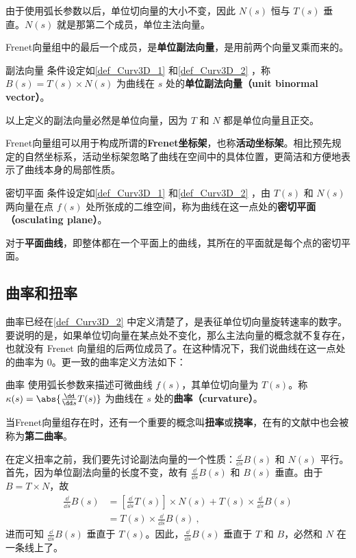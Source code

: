 由于使用弧长参数以后，单位切向量的大小不变，因此 $N(s)$ 恒与 $T(s)$ 垂直。$N(s)$ 就是那第二个成员，单位主法向量。

Frenet向量组中的最后一个成员，是\textbf{单位副法向量}，是用前两个向量叉乘而来的。

\begin{definition}{副法向量}
条件设定如\autoref{def_Curv3D_1} 和\autoref{def_Curv3D_2} ，称 $B(s)=T(s)\times N(s)$ 为曲线在 $s$ 处的\textbf{单位副法向量（unit binormal vector）}。
\end{definition}

以上定义的副法向量必然是单位向量，因为 $T$ 和 $N$ 都是单位向量且正交。

Frenet向量组可以用于构成所谓的\textbf{Frenet坐标架}，也称\textbf{活动坐标架}。相比预先规定的自然坐标系，活动坐标架忽略了曲线在空间中的具体位置，更简洁和方便地表示了曲线本身的局部性质。

\begin{definition}{密切平面}
条件设定如\autoref{def_Curv3D_1} 和\autoref{def_Curv3D_2} ，由 $T(s)$ 和 $N(s)$ 两向量在点 $f(s)$ 处所张成的二维空间，称为曲线在这一点处的\textbf{密切平面（osculating plane）}。
\end{definition}

对于\textbf{平面曲线}，即整体都在一个平面上的曲线，其所在的平面就是每个点的密切平面。

\subsection{曲率和扭率}

曲率已经在\autoref{def_Curv3D_2} 中定义清楚了，是表征单位切向量旋转速率的数字。要说明的是，如果单位切向量在某点处不变化，那么主法向量的概念就不复存在，也就没有 Frenet 向量组的后两位成员了。在这种情况下，我们说曲线在这一点处的曲率为 $0$。更一致的曲率定义方法如下：
\begin{definition}{曲率}
使用弧长参数来描述可微曲线 $f(s)$，其单位切向量为 $T(s)$。称 $\kappa(s)=\abs{\frac{\dd}{\dd s}T(s)}$ 为曲线在 $s$ 处的\textbf{曲率（curvature）}。
\end{definition}

当Frenet向量组存在时，还有一个重要的概念叫\textbf{扭率}或\textbf{挠率}，在有的文献中也会被称为\textbf{第二曲率}。

在定义扭率之前，我们要先讨论副法向量的一个性质：$\frac{\dd}{\dd s}B(s)$ 和 $N(s)$ 平行。首先，因为单位副法向量的长度不变，故有 $\frac{\dd}{\dd s}B(s)$ 和 $B(s)$ 垂直。由于 $B=T\times N$，故 
\begin{equation}
\begin{aligned}
\frac{\dd}{\dd s}B(s)&=[\frac{\dd}{\dd s}T(s)]\times N(s)+T(s)\times\frac{\dd}{\dd s}B(s)\\&=T(s)\times\frac{\dd}{\dd s}B(s)~,
\end{aligned}
\end{equation}
进而可知 $\frac{\dd}{\dd s}B(s)$ 垂直于 $T(s)$。因此，$\frac{\dd}{\dd s}B(s)$ 垂直于 $T$ 和 $B$，必然和 $N$ 在一条线上了。

